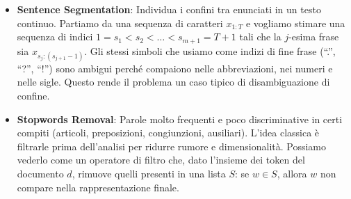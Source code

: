 \begin{itemize}
                \item \textbf{Sentence Segmentation}: Individua i confini tra enunciati in un testo continuo. Partiamo da una sequenza di caratteri $x_{1:T}$ e vogliamo stimare una sequenza di indici $1=s_1<s_2<\dots<s_{m+1}=T+1$ tali che la $j$-esima frase sia $x_{s_j:(s_{j+1}-1)}$. Gli stessi simboli che usiamo come indizi di fine frase (“.”, “?”, “!”) sono ambigui perché compaiono nelle abbreviazioni, nei numeri e nelle sigle. Questo rende il problema un caso tipico di disambiguazione di confine.
            
                \item \textbf{Stopwords Removal}: Parole molto frequenti e poco discriminative in certi compiti (articoli, preposizioni, congiunzioni, ausiliari). L’idea classica è filtrarle prima dell’analisi per ridurre rumore e dimensionalità. Possiamo vederlo come un operatore di filtro che, dato l’insieme dei token del documento $d$, rimuove quelli presenti in una lista $S$: se $w\in S$, allora $w$ non compare nella rappresentazione finale.
            
            \end{itemize}
            
            
            
    
